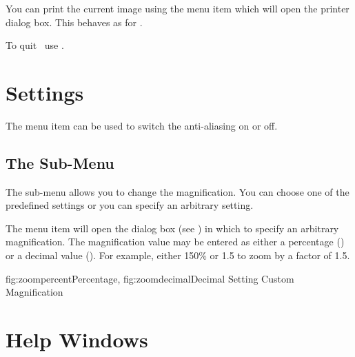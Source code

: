 
You can print the current image using the  menu
item which will open the printer dialog box. This behaves as for
\FlowframTk.


To quit \JDRView\ use .


\chapter{Settings}
\label{sec:settings}


The  menu item can be used to switch
the anti-aliasing on or off.

\section{The  Sub-Menu}
\label{sec:zoommenu}


The  sub-menu allows you to change
the magnification. You can choose one of the predefined
settings%
or you can specify an arbitrary setting.


The  menu item will open the
 dialog box (see ) in
which to specify an arbitrary magnification.  The magnification
value may be entered as either a percentage
() or a decimal value
(). For example, either 150\% or 1.5 to
zoom by a factor of 1.5. 

 {
   {fig:zoompercent}{}{Percentage},
   {fig:zoomdecimal}{}{Decimal}
 }
 {Setting Custom Magnification}


\chapter{Help Windows}
\label{sec:helpwindows}

